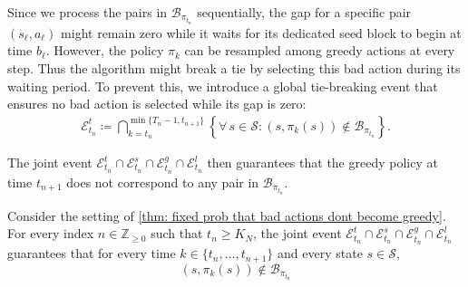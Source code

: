 Since we process the pairs in $\mathcal B_{\pi_{t_n}}$ sequentially, the gap for a specific pair $(s_\ell, a_\ell)$ might remain zero while it waits for its dedicated seed block to begin at time $b_\ell$. 
However, the policy $\pi_k$ can be resampled among greedy actions at every step. Thus the algorithm might break a tie by selecting this bad action during its waiting period. 
To prevent this, we introduce a global tie-breaking event that ensures no bad action is selected while its gap is zero:
\begin{align}
\label{eq: def global tie event}
\mathcal E^t_{t_n} \coloneqq
\bigcap_{k=t_n}^{\min\{ T_n-1 , t_{n+1} \}}
\left\{
\forall \, s \in \mathcal S : 
(s, \pi_k(s)) \notin \mathcal B_{\pi_{t_n}}
\right\} .
\end{align}

The joint event $\mathcal E^t_{t_n} \cap \mathcal E^s_{t_n} \cap \mathcal E^g_{t_n} \cap \mathcal E^l_{t_n}$ then guarantees that the greedy policy at time $t_{n+1}$ does not correspond to any pair in $\mathcal B_{\pi_{t_n}}$.


\begin{lemma}
\label{thm: event that yields positive gaps}
Consider the setting of \autoref{thm: fixed prob that bad actions dont become greedy}.
For every index $n \in \mathbb Z_{\ge 0}$ such that $t_n \ge K_N$,
the joint event $\mathcal E^t_{t_n} \cap \mathcal E^s_{t_n} \cap \mathcal E^g_{t_n} \cap \mathcal E^l_{t_n}$ guarantees that
for every time $k \in \{t_n, \dots, t_{n+1}\}$
and every state $s \in \mathcal S$,
\[
(s,\pi_{k}(s)) \notin \mathcal B_{\pi_{t_n}}
\]
\end{lemma}
\vspace{-0.6cm}


